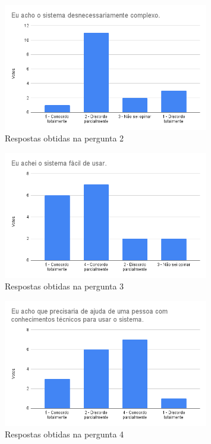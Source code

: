 \documentclass[12pt]{tcc}
\begin{document}
	\pagebreak

	\begin{figure}[!ht]
		\centering
		\includegraphics[width=0.8\textwidth]{figures/respostas-pergunta-2.png}
		\caption{Respostas obtidas na pergunta 2}
		\label{fig:respostas-pergunta-2}
	\end{figure}

	
	\begin{figure}[!ht]
		\centering
		\includegraphics[width=0.8\textwidth]{figures/respostas-pergunta-3.png}
		\caption{Respostas obtidas na pergunta 3}
		\label{fig:respostas-pergunta-3}
	\end{figure}

	\begin{figure}[!ht]
		\centering
		\includegraphics[width=0.8\textwidth]{figures/respostas-pergunta-4.png}
		\caption{Respostas obtidas na pergunta 4}
		\label{fig:respostas-pergunta-4}
	\end{figure}
\end{document}
